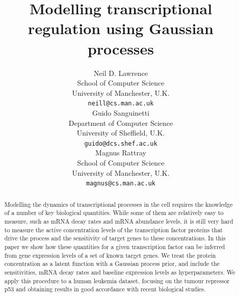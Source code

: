 \documentclass[english]{article}
\title{Modelling transcriptional regulation using Gaussian processes}
\author{
Neil D. Lawrence \\
School of Computer Science\\
University of Manchester, U.K.\\
\texttt{neill@cs.man.ac.uk} \\
\And
Guido Sanguinetti\\
Department of Computer Science\\
University of Sheffield, U.K. \\
\texttt{guido@dcs.shef.ac.uk} \\
\And
Magnus Rattray\\
School of Computer Science\\
University of Manchester, U.K. \\
\texttt{magnus@cs.man.ac.uk} \\
}
\begin{document}
\maketitle

\begin{abstract}
Modelling the dynamics of transcriptional processes in the cell requires the
knowledge of a number of key biological quantities. While some of them are
relatively easy to measure, such as mRNA decay rates and mRNA abundance levels,
it is still very hard to measure the active concentration levels of the 
transcription factor proteins that drive the process and the sensitivity of
target genes to these concentrations. In this paper we show how these 
quantities for a given transcription factor can be inferred
from gene expression levels of a set of known target genes. We treat the
protein concentration as a latent function with a Gaussian process prior, and
include the sensitivities, mRNA decay rates and baseline expression levels as
hyperparameters. We apply this procedure to a human leukemia dataset, focusing
on the tumour repressor p53 and obtaining results in good accordance with 
recent biological studies.
\end{abstract}
\end{document}
